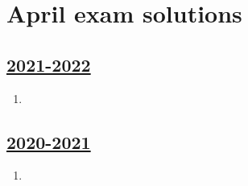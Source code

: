 
\newpage
\thispagestyle{empty}
\section{April exam solutions}
 


\subsection[2021-2022]{\hyperref[sec:kr_03_2021_2022]{2021-2022}}
\label{sec:sol_kr_03_2021_2022} %



\begin{enumerate}

\item 


\end{enumerate}
    

\subsection[2020-2021]{\hyperref[sec:kr_03_2020_2021]{2020-2021}}
\label{sec:sol_kr_03_2020_2021} %



\begin{enumerate}
    
    
    
    \item
 
 
\end{enumerate}


